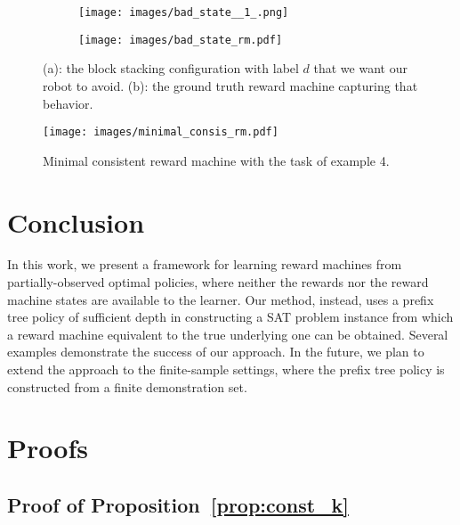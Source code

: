 \documentclass[letterpaper, 10 pt, conference]{ieeeconf}
\begin{document}
\begin{figure}[h!]
    \centering
    \begin{subfigure}[t]{0.33\columnwidth}
        \centering
        \texttt{[image: images/bad\_state\_\_1\_.png]}
        \caption{}
        \label{fig:badstate}
    \end{subfigure}
    \hfill
    \begin{subfigure}[t]{0.54\columnwidth}
        \centering
        \texttt{[image: images/bad\_state\_rm.pdf]}
        \caption{}
        \label{fig:bad_state_rm}
    \end{subfigure}
    \caption{(a): the block stacking configuration with label $d$ that we want our robot to avoid. (b): the ground truth reward machine capturing that behavior.}
    \label{fig:mainfigure}
    \vspace{-0.3cm}
\end{figure}


\begin{figure}[h!]
    \centering
    \texttt{[image: images/minimal\_consis\_rm.pdf]}
    \caption{Minimal consistent reward machine with the task of example 4.}
    \label{fig:minimal}
    \vspace{-0.3cm}
\end{figure}

\vspace{-2mm}
\section{Conclusion}
In this work, we present a framework for learning reward machines from partially-observed optimal policies, where neither the rewards nor the reward machine states are available to the learner. Our method, instead, uses a prefix tree policy of sufficient depth in constructing a SAT problem instance from which a reward machine equivalent to the true underlying one can be obtained. Several examples demonstrate the success of our approach. In the future, we plan to extend the approach to the finite-sample settings, where the prefix tree policy is constructed from a finite demonstration set. 



\appendix
\section{Proofs}

\subsection{Proof of Proposition~\ref{prop:const_k}}\label{app:proof_const_k}
\end{document}
